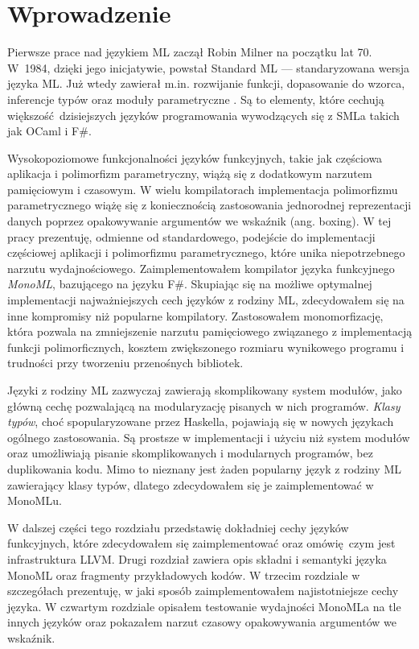 \documentclass[declaration,shortabstract]{iithesis}
\author         {Mateusz Lewko}
\date           {}                     %
\begin{document}

\chapter{Wprowadzenie}
Pierwsze prace nad językiem ML zaczął Robin Milner na początku lat 70. W~1984, 
dzięki jego inicjatywie, powstał Standard ML --- standaryzowana wersja języka 
ML. Już wtedy zawierał m.in. rozwijanie funkcji, dopasowanie do wzorca, 
inferencje typów oraz moduły parametryczne \cite{sml_proposal}. Są to elementy,
które cechują większość dzisiejszych języków programowania 
wywodzących się z SMLa takich jak OCaml i F\#. 

Wysokopoziomowe funkcjonalności
języków funkcyjnych, takie jak częściowa aplikacja i polimorfizm parametryczny, 
wiążą się z dodatkowym narzutem pamięciowym i czasowym. W wielu kompilatorach 
implementacja polimorfizmu parametrycznego wiążę się z koniecznością 
zastosowania jednorodnej reprezentacji danych poprzez opakowywanie argumentów 
we wskaźnik (ang. boxing). W tej pracy prezentuję, odmienne od standardowego,
podejście do implementacji częściowej aplikacji i polimorfizmu parametrycznego, 
które unika niepotrzebnego narzutu wydajnościowego. Zaimplementowałem kompilator 
języka funkcyjnego \textit{MonoML}, bazującego na języku F\#. 
Skupiając się na możliwe optymalnej implementacji najważniejszych cech języków 
z rodziny ML, zdecydowałem się na inne kompromisy niż popularne kompilatory. 
Zastosowałem monomorfizację, która pozwala na zmniejszenie narzutu pamięciowego 
związanego z implementacją funkcji polimorficznych, kosztem zwiększonego 
rozmiaru wynikowego programu i trudności przy tworzeniu przenośnych 
bibliotek.

Języki z rodziny ML zazwyczaj zawierają skomplikowany system modułów, jako 
główną cechę pozwalającą na modularyzację pisanych w nich programów.
\textit{Klasy typów}, choć spopularyzowane przez Haskella, pojawiają
się w nowych językach ogólnego zastosowania. Są prostsze w implementacji
i użyciu niż system modułów oraz umożliwiają pisanie skomplikowanych i modularnych 
programów, bez duplikowania kodu. Mimo to nieznany jest żaden 
popularny język z rodziny ML zawierający klasy typów, dlatego zdecydowałem się je 
zaimplementować w MonoMLu.

W dalszej części tego rozdziału przedstawię dokładniej cechy języków funkcyjnych, 
które zdecydowałem się zaimplementować oraz omówię czym jest infrastruktura LLVM. 
Drugi rozdział zawiera opis składni i semantyki języka MonoML oraz 
fragmenty przykładowych kodów. W trzecim rozdziale w szczegółach
prezentuję, w jaki sposób zaimplementowałem najistotniejsze cechy języka.
W czwartym rozdziale opisałem testowanie wydajności MonoMLa
na tle innych języków oraz pokazałem narzut czasowy opakowywania argumentów 
we wskaźnik.
\end{document}

